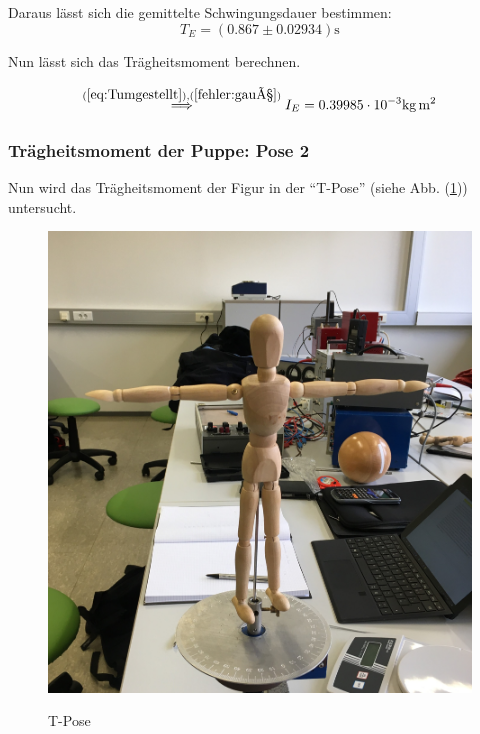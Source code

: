 Daraus lässt sich die gemittelte Schwingungsdauer bestimmen:
\begin{equation*}
  T_E = (0.867 \pm 0.02934) \unit\second
\end{equation*}

Nun lässt sich das Trägheitsmoment berechnen.

\begin{equation*}
  \stackrel{(\ref{eq:Tumgestellt}),(\ref{fehler:gauß})}{\implies} I_E = 0.39985 \cdot 10^{-3}  %
  \unit{\kilo\gram\meter\squared} %
\end{equation*}

%
%
%

\subsubsection{Trägheitsmoment der Puppe: Pose 2}

Nun wird das Trägheitsmoment der Figur in der \enquote{T-Pose} (siehe Abb. (\ref{fig:pose2})) untersucht.

\begin{figure}[H]
  \caption{T-Pose}
  \centering
  \includegraphics[width=0.3\columnwidth]{pictures/puppe_tpose.jpg}
  \label{fig:pose2}
\end{figure}

